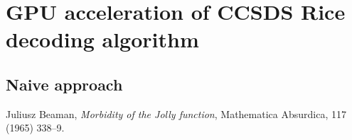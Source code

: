 \documentclass[licencjacka,en]{pracamgr}
\begin{document}
\chapter{GPU acceleration of CCSDS Rice decoding algorithm}\label{r:losers}

\section{Naive approach}







\begin{thebibliography}{99}

	 Juliusz Beaman, \textit{Morbidity of the Jolly
		function}, Mathematica Absurdica, 117 (1965) 338--9.


\end{thebibliography}
\end{document}

